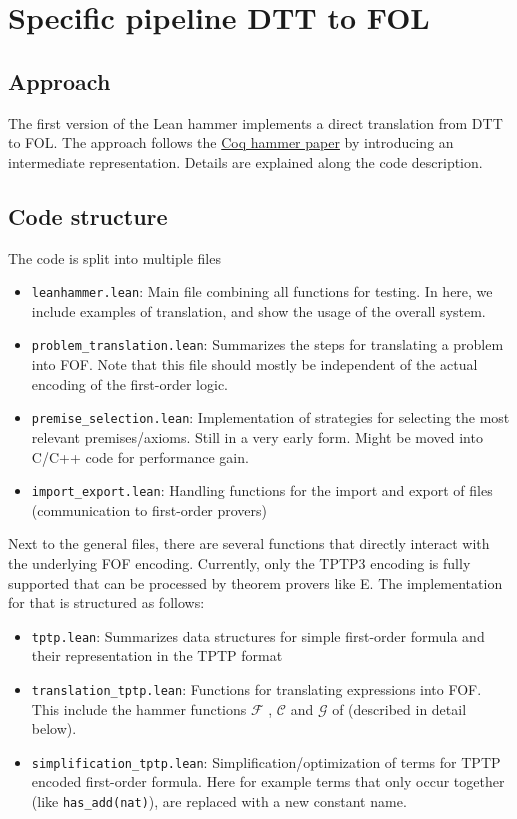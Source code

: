 \documentclass[a4paper]{article}
\newcommand{\F}[0]{$\mathcal{F}$ }
\newcommand{\G}[0]{$\mathcal{G}$ }
\newcommand{\C}[0]{$\mathcal{C}$ }
\begin{document}
\newpage
\section{Specific pipeline DTT to FOL}
\label{sec:specific_pipeline_DTT_FOL}
\subsection{Approach}
The first version of the Lean hammer implements a direct translation from DTT to FOL. The approach follows the \href{https://link.springer.com/article/10.1007/s10817-018-9458-4}{Coq hammer paper} \cite{CoqHammer} by introducing an intermediate representation. Details are explained along the code description.
\subsection{Code structure}
The code is split into multiple files
\begin{itemize}
	\item \texttt{leanhammer.lean}: Main file combining all functions for testing. In here, we include examples of translation, and show the usage of the overall system.
	\item \texttt{problem\_translation.lean}: Summarizes the steps for translating a problem into FOF. Note that this file should mostly be independent of the actual encoding of the first-order logic.
	\item \texttt{premise\_selection.lean}: Implementation of strategies for selecting the most relevant premises/axioms. Still in a very early form. Might be moved into C/C++ code for performance gain. 
	\item \texttt{import\_export.lean}: Handling functions for the import and export of files (communication to first-order provers)
\end{itemize}

Next to the general files, there are several functions that directly interact with the underlying FOF encoding. Currently, only the TPTP3 encoding is fully supported that can be processed by theorem provers like E. The implementation for that is structured as follows:
\begin{itemize}
	\item \texttt{tptp.lean}: Summarizes data structures for simple first-order formula and their representation in the TPTP format
	\item \texttt{translation\_tptp.lean}: Functions for translating expressions into FOF. This include the hammer functions \F, \C and \G of  \cite{CoqHammer} (described in detail below). 
	\item \texttt{simplification\_tptp.lean}: Simplification/optimization of terms for TPTP encoded first-order formula. Here for example terms that only occur together (like \texttt{has\_add(nat)}), are replaced with a new constant name.
\end{itemize}
\end{document}
